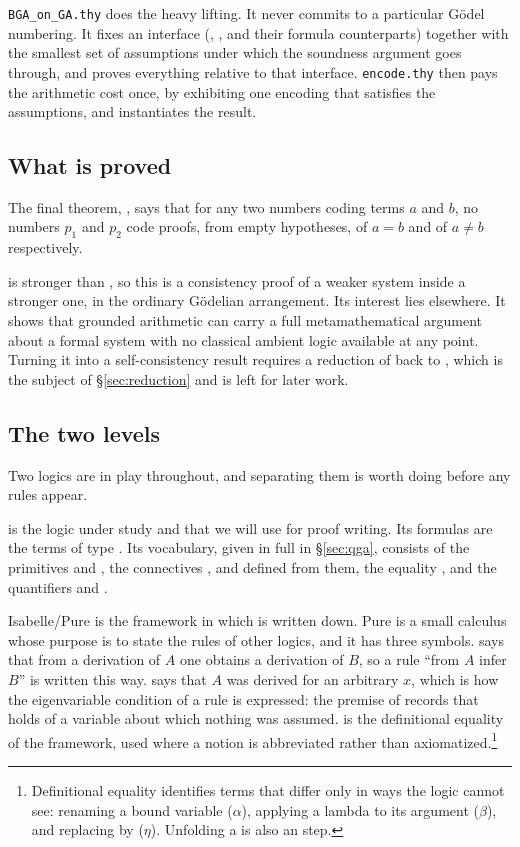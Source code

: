 \documentclass[11pt]{article}
\begin{document}
\noindent
\texttt{BGA\_on\_GA.thy} does the heavy lifting.  It never commits to a
particular G\"odel numbering.  It fixes an interface (,
,  and their formula counterparts) together with the
smallest set of assumptions under which the soundness argument goes through,
and proves everything relative to that interface.  \texttt{encode.thy} then
pays the arithmetic cost once, by exhibiting one encoding that satisfies the
assumptions, and instantiates the result.

\subsection{What is proved}

The final theorem, , says that for any two
numbers coding \BGA{} terms $a$ and $b$, no numbers $p_1$ and $p_2$ code \BGA{}
proofs, from empty hypotheses, of $a = b$ and of $a \neq b$ respectively.

\QGA{} is stronger than \BGA, so this is a consistency proof of a weaker system
inside a stronger one, in the ordinary G\"odelian arrangement.  Its interest lies
elsewhere.  It shows that grounded arithmetic can carry a full metamathematical
argument about a formal system with no classical ambient logic available at any
point.  Turning it into a self-consistency result requires a reduction of \QGA{}
back to \BGA, which is the subject of \S\ref{sec:reduction} and is left for later
work.

\subsection{The two levels}
\label{sec:levels}

Two logics are in play throughout, and separating them is worth doing before any
rules appear.

\QGA{} is the logic under study and that we will use for proof writing.  Its formulas are the terms of type .
Its vocabulary, given in full in \S\ref{sec:qga}, consists of the primitives
 and , the connectives ,  and  defined from
them, the equality \isa{=}, and the quantifiers  and .

Isabelle/Pure is the framework in which \QGA{} is written down.  Pure is a small
calculus whose purpose is to state the rules of other logics, and it has three
symbols.   says that from a derivation of $A$ one obtains a derivation
of $B$, so a rule ``from $A$ infer $B$'' is written this way.   says
that $A$ was derived for an arbitrary $x$, which is how the eigenvariable
condition of a rule is expressed: the premise  of
 records that  holds of a variable about which nothing was
assumed.   is the definitional equality of the framework, used where a
\QGA{} notion is abbreviated rather than axiomatized.\footnote{%
  Definitional equality identifies terms that differ only in ways the logic
  cannot see: renaming a bound variable ($\alpha$), applying a lambda to its
  argument ($\beta$), and replacing  by  ($\eta$).  Unfolding
  a  is also an  step.}
\end{document}
